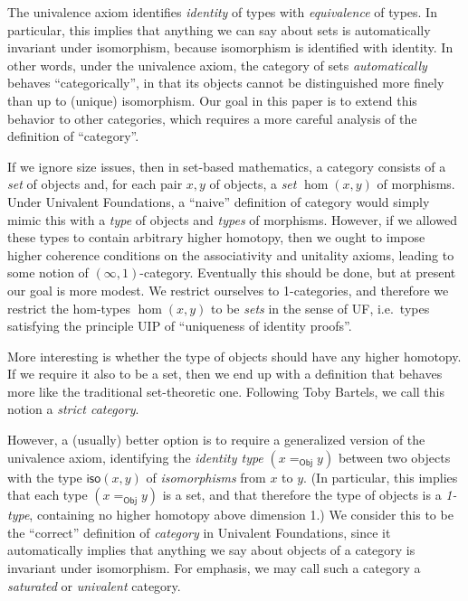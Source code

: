 \documentclass{amsart}
\theoremstyle{definition}
\theoremstyle{remark}
\numberwithin{equation}{section}
\begin{document}
The univalence axiom identifies \emph{identity} of types with \emph{equivalence} of types.
In particular, this implies that anything we can say about sets is automatically invariant under isomorphism, because isomorphism is identified with identity.
In other words, under the univalence axiom, the category of sets \emph{automatically} behaves ``categorically'', in that its objects cannot be distinguished more finely than up to (unique) isomorphism.
Our goal in this paper is to extend this behavior to other categories, which requires a more careful analysis of the definition of ``category''.

If we ignore size issues, then in set-based mathematics, a category consists of a \emph{set} of objects and, for each pair $x,y$ of objects, a \emph{set} $\hom(x,y)$ of morphisms.
Under Univalent Foundations, a ``naive'' definition of category would simply mimic this with a \emph{type} of objects and \emph{types} of morphisms.
However, if we allowed these types to contain arbitrary higher homotopy, then we ought to impose higher coherence conditions on the associativity and unitality axioms, leading to some notion of $(\infty,1)$-category.
Eventually this should be done, but at present our goal is more modest.
We restrict ourselves to 1-categories, and therefore we restrict the hom-types $\hom(x,y)$ to be \emph{sets} in the sense of UF, i.e.\ types satisfying the principle UIP of ``uniqueness of identity proofs''.

More interesting is whether the type of objects should have any higher homotopy.
If we require it also to be a set, then we end up with a definition that behaves more like the traditional set-theoretic one.
Following Toby Bartels, we call this notion a \emph{strict category}.

However, a (usually) better option is to require a generalized version of the univalence axiom, identifying the \emph{identity type} $(x=_{\mathsf{Obj}} y)$ between two objects with the type $\mathsf{iso}(x,y)$ of \emph{isomorphisms} from $x$ to $y$.
(In particular, this implies that each type $(x=_{\mathsf{Obj}} y)$ is a set, and that therefore the type of objects is a \emph{1-type}, containing no higher homotopy above dimension 1.)
We consider this to be the ``correct'' definition of \emph{category} in Univalent Foundations, since it automatically implies that anything we say about objects of a category is invariant under isomorphism.
For emphasis, we may call such a category a \emph{saturated} or \emph{univalent} category.
\end{document}
